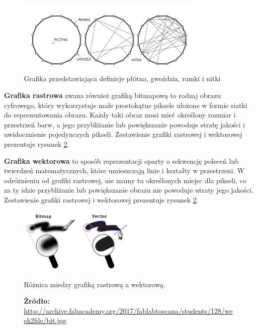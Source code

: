 \documentclass[a4paper, 12pt, polish, twoside]{extreport}
\begin{document}
    \begin{figure}[H]
        \centering
        \includegraphics[width=0.8\textwidth]{img/2-theory/cztery-pojecia.png}
        \caption[Grafika przedstawiająca płótno, gwoździe, ramkę i nitki]{Grafika przedstawiająca definicje płótna, gwoździa, ramki i nitki}
        \label{theory-basic-definitions-vis}
    \end{figure}
    
    \textbf{Grafika rastrowa} zwana również grafiką bitmapową to rodzaj obrazu cyfrowego, który wykorzystuje małe prostokątne piksele ułożone w formie siatki do reprezentowania obrazu. Każdy taki obraz musi mieć określony rozmiar i przestrzeń barw, a jego przybliżanie lub powiększanie powoduje stratę jakości i uwidocznienie pojedynczych pikseli. Zestawienie grafiki rastrowej i wektorowej prezentuje rysunek \ref{theory-raster-vs-vector}.
    
    \textbf{Grafika wektorowa} to sposób reprezentacji oparty o sekwencję poleceń lub twierdzeń matematycznych, które umieszczają linie i kształty w przestrzeni. W odróżnieniu od grafiki rastrowej, nie mamy tu określonych miejsc dla pikseli, co za ty idzie przybliżanie lub powiększanie obrazu nie powoduje utraty jego jakości. Zestawienie grafiki rastrowej i wektorowej prezentuje rysunek \ref{theory-raster-vs-vector}.
    
    \begin{figure}[H]
        \centering
        \includegraphics[width=0.5\textwidth,keepaspectratio]{img/2-theory/raster-vs-vector.jpg}
        \caption[Różnica miedzy grafiką rastrową a wektorową]{Różnica miedzy grafiką rastrową a wektorową.}
        \caption*{\footnotesize{\textbf{Źródło:} {\url{http://archive.fabacademy.org/2017/fablabtoscana/students/128/week2file/bit.jpg}}}}
        \label{theory-raster-vs-vector}
    \end{figure}
    
\end{document}
